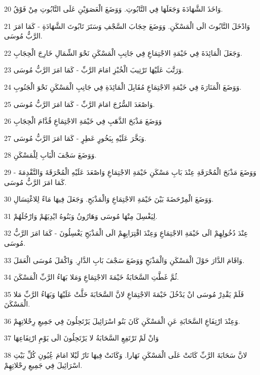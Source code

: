 \par 20 وَاخَذَ الشَّهَادَةَ وَجَعَلَهَا فِي التَّابُوتِ. وَوَضَعَ الْعَصَوَيْنِ عَلَى التَّابُوتِ مِنْ فَوْقُ.
\par 21 وَادْخَلَ التَّابُوتَ الَى الْمَسْكَنِ. وَوَضَعَ حِجَابَ السَّجْفِ وَسَتَرَ تَابُوتَ الشَّهَادَةِ - كَمَا امَرَ الرَّبُّ مُوسَى.
\par 22 وَجَعَلَ الْمَائِدَةَ فِي خَيْمَةِ الاجْتِمَاعِ فِي جَانِبِ الْمَسْكَنِ نَحْوَ الشِّمَالِ خَارِجَ الْحِجَابِ.
\par 23 وَرَتَّبَ عَلَيْهَا تَرْتِيبَ الْخُبْزِ امَامَ الرَّبِّ - كَمَا امَرَ الرَّبُّ مُوسَى.
\par 24 وَوَضَعَ الْمَنَارَةَ فِي خَيْمَةِ الاجْتِمَاعِ مُقَابِلَ الْمَائِدَةِ فِي جَانِبِ الْمَسْكَنِ نَحْوَ الْجَنُوبِ.
\par 25 وَاصْعَدَ السُّرُجَ امَامَ الرَّبِّ - كَمَا امَرَ الرَّبُّ مُوسَى.
\par 26 وَوَضَعَ مَذْبَحَ الذَّهَبِ فِي خَيْمَةِ الاجْتِمَاعِ قُدَّامَ الْحِجَابِ
\par 27 وَبَخَّرَ عَلَيْهِ بِبَخُورٍ عَطِرٍ - كَمَا امَرَ الرَّبُّ مُوسَى.
\par 28 وَوَضَعَ سَجْفَ الْبَابِ لِلْمَسْكَنِ.
\par 29 وَوَضَعَ مَذْبَحَ الْمُحْرَقَةِ عِنْدَ بَابِ مَسْكَنِ خَيْمَةِ الاجْتِمَاعِ وَاصْعَدَ عَلَيْهِ الْمُحْرَقَةَ وَالتَّقْدِمَةَ - كَمَا امَرَ الرَّبُّ مُوسَى.
\par 30 وَوَضَعَ الْمِرْحَضَةَ بَيْنَ خَيْمَةِ الاجْتِمَاعِ وَالْمَذْبَحِ. وَجَعَلَ فِيهَا مَاءً لِلاغْتِسَالِ.
\par 31 لِيَغْسِلَ مِنْهَا مُوسَى وَهَارُونُ وَبَنُوهُ ايْدِيَهُمْ وَارْجُلَهُمْ.
\par 32 عِنْدَ دُخُولِهِمْ الَى خَيْمَةِ الاجْتِمَاعِ وَعِنْدَ اقْتِرَابِهِمْ الَى الْمَذْبَحِ يَغْسِلُونَ - كَمَا امَرَ الرَّبُّ مُوسَى.
\par 33 وَاقَامَ الدَّارَ حَوْلَ الْمَسْكَنِ وَالْمَذْبَحِ وَوَضَعَ سَجْفَ بَابِ الدَّارِ. وَاكْمَلَ مُوسَى الْعَمَلَ.
\par 34 ثُمَّ غَطَّتِ السَّحَابَةُ خَيْمَةَ الاجْتِمَاعِ وَمَلا بَهَاءُ الرَّبِّ الْمَسْكَنَ.
\par 35 فَلَمْ يَقْدِرْ مُوسَى انْ يَدْخُلَ خَيْمَةَ الاجْتِمَاعِ لانَّ السَّحَابَةَ حَلَّتْ عَلَيْهَا وَبَهَاءُ الرَّبِّ مَلا الْمَسْكَنَ.
\par 36 وَعِنْدَ ارْتِفَاعِ السَّحَابَةِ عَنِ الْمَسْكَنِ كَانَ بَنُو اسْرَائِيلَ يَرْتَحِلُونَ فِي جَمِيعِ رِحْلاتِهِمْ.
\par 37 وَانْ لَمْ تَرْتَفِعِ السَّحَابَةُ لا يَرْتَحِلُونَ الَى يَوْمِ ارْتِفَاعِهَا
\par 38 لانَّ سَحَابَةَ الرَّبِّ كَانَتْ عَلَى الْمَسْكَنِ نَهَارا. وَكَانَتْ فِيهَا نَارٌ لَيْلا امَامَ عُِيُونِ كُلِّ بَيْتِ اسْرَائِيلَ فِي جَمِيعِ رِحْلاتِهِمْ.

